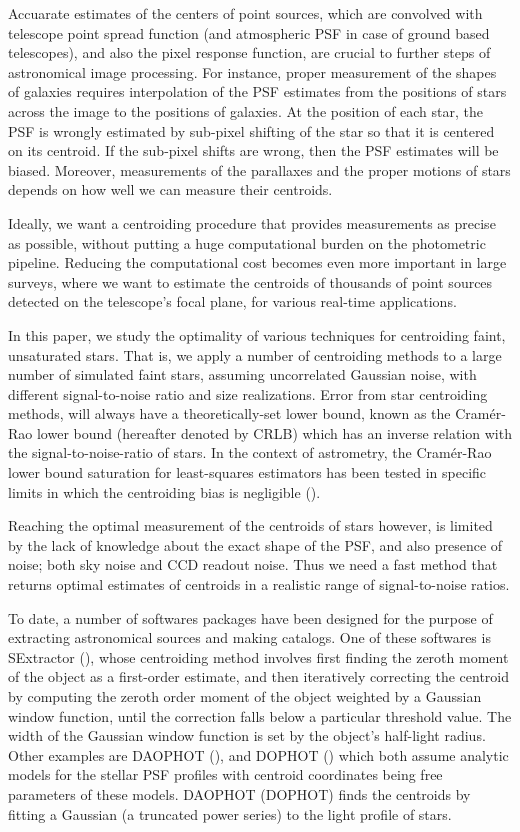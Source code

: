 \documentclass[12pt, preprint]{aastex}
\begin{document}
Accuarate estimates of the centers of point
sources, which are convolved with telescope point spread function (and atmospheric PSF in case of
ground based telescopes), and also the pixel response function, are crucial to further steps of
astronomical image processing. For instance, proper measurement of the shapes of galaxies
requires interpolation of the PSF estimates from the positions of stars across the
image to the positions of galaxies. At the position of each star, the PSF is wrongly estimated by sub-pixel 
shifting of the star so that it is centered on its centroid. If the sub-pixel shifts are wrong, then 
the PSF estimates will be biased. Moreover, measurements of the parallaxes and the proper motions of stars
depends on how well we can measure their centroids. 

Ideally, we want a centroiding procedure that provides measurements as precise as possible,
without putting a huge computational burden on the photometric pipeline.
Reducing the computational cost becomes even more important in large surveys,
where we want to estimate the centroids of thousands of point sources detected
on the telescope's focal plane, for various real-time applications.

In this paper, we study the optimality of various techniques for centroiding 
faint, unsaturated stars. That is, we apply a number of centroiding methods 
to a large number of simulated faint stars, assuming uncorrelated Gaussian noise, 
with different signal-to-noise ratio and size realizations. Error from star 
centroiding methods, will always have a theoretically-set lower bound, 
known as the Cram\'{e}r-Rao lower bound (hereafter denoted by CRLB) which 
has an inverse relation with the signal-to-noise-ratio of stars. In the context 
of astrometry, the Cram\'{e}r-Rao lower bound saturation for least-squares 
estimators has been tested in specific limits in which the centroiding bias is 
negligible (\citealt{lobos}). 

Reaching the optimal measurement of the centroids of stars however, is limited
by the lack of knowledge about the exact shape of the PSF, and also presence of noise;
both sky noise and CCD readout noise. Thus we need a fast method that returns
optimal estimates of centroids in a realistic range of signal-to-noise ratios.

To date, a number of softwares packages have been designed for the purpose of extracting astronomical
sources and making catalogs. One of these softwares is SExtractor (\citealt{sextractor}),
whose centroiding method involves first finding the zeroth moment of the object
as a first-order estimate, and then iteratively correcting the centroid by computing
the zeroth order moment of the object weighted by a Gaussian window function,
until the correction falls below a particular threshold value.
The width of the Gaussian window function is set by the object's half-light radius.
Other examples are DAOPHOT (\citealt{daophot}), and DOPHOT (\citealt{dophot})
which both assume analytic models for the stellar PSF profiles with centroid
coordinates being free parameters of these models.
DAOPHOT (DOPHOT) finds the centroids by fitting a Gaussian (a truncated power series) to 
the light profile of stars.
\end{document}
